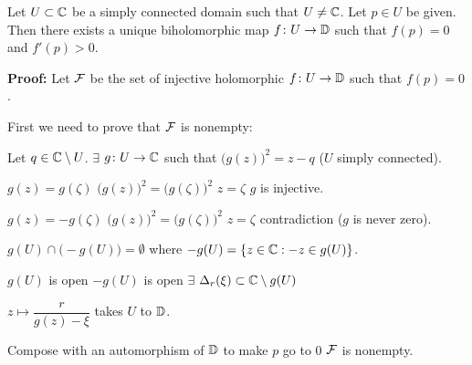 \documentclass[10pt,aspectratio=169]{beamer}
\begin{document}
\begin{frame}
\begin{theorem}
Let $U \subset {\mathbb{C}}$ be a simply connected domain such that $U \not= {\mathbb{C}}$.
Let $p \in U$ be given.  Then there exists a unique biholomorphic
map $f \colon U \to {\mathbb{D}}$ such that $f(p) = 0$ and
$f'(p) > 0$.
\end{theorem}

\pause


\textbf{Proof:}
Let ${\mathcal{F}}$ be the set of injective holomorphic $f \colon U \to {\mathbb{D}}$ such that $f(p) = 0$. 

\pause
\medskip

First we need to prove that ${\mathcal{F}}$ is nonempty:

\medskip
\pause

Let $q \in {\mathbb{C}} \setminus U$.
\quad
\pause
$\exists$ $g \colon U \to {\mathbb{C}}$ such that ${\bigl(g(z)\bigr)}^2 = z-q$
\quad ($U$ simply connected).

\medskip

\pause
$g(z)=g(\zeta)$
\pause
\wthus
${\bigl(g(z)\bigr)}^2={\bigl(g(\zeta)\bigr)}^2$
\pause
\wthus
$z=\zeta$
\pause
\wthus
$g$ is injective.

\medskip

\pause
$g(z)=-g(\zeta)$
\pause
\wthus
${\bigl(g(z)\bigr)}^2={\bigl(g(\zeta)\bigr)}^2$
\pause
\wthus
$z=\zeta$
\pause
\wthus
contradiction
($g$ is never zero).

\pause
\thus\quad
$g(U) \cap \bigl( - g(U) \bigr) = \emptyset$
\quad
where
$-g(U) = \{ z \in {\mathbb{C}} : -z \in g(U) \}$.

\medskip
\pause

$g(U)$ is open
\pause
\wthus
$-g(U)$ is open
\pause
\wthus $\exists$ $\Delta_r(\xi) \subset  {\mathbb{C}} \setminus g(U)$

\medskip

\pause
\thus \quad
$z \mapsto \dfrac{r}{g(z)-\xi}$
\quad
takes $U$ to ${\mathbb{D}}$.

\medskip

\pause
Compose with an automorphism of ${\mathbb{D}}$ to make $p$ go to $0$
\pause
\wthus
${\mathcal{F}}$ is nonempty.
\end{frame}
\end{document}
